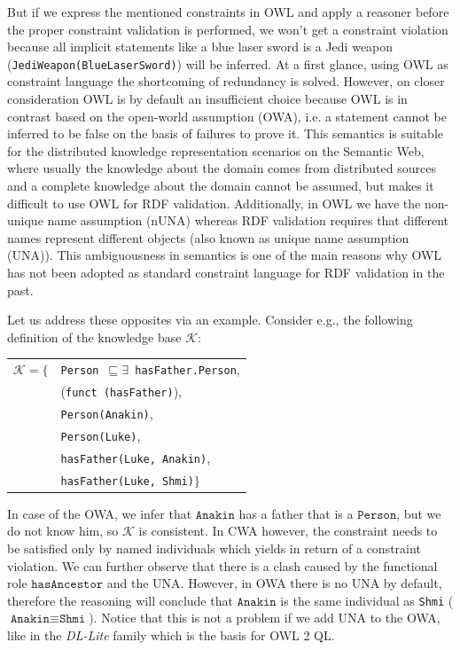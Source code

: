 \documentclass{llncs}
\newcommand{\ms}[1]{\texttt{#1}}
\newenvironment{DL}{
  \begin{tabular}{r l}

}{
  \end{tabular}
  \linebreak
}
\begin{document}
But if we express the mentioned constraints in OWL and apply a reasoner before the proper constraint validation is performed, we won't get a constraint violation because all implicit statements like a blue laser sword is a Jedi weapon (\ms{JediWeapon(BlueLaserSword)}) will be inferred. At a first glance, using OWL as constraint language the shortcoming of redundancy is solved. However, on closer consideration OWL is by default an insufficient choice because OWL is in contrast based on the open-world assumption (OWA), i.e. a statement cannot be inferred to be false on the basis of failures to prove it. 
This semantics is suitable for the distributed knowledge representation scenarios on the Semantic Web, 
where usually the knowledge about the domain comes from distributed
sources and a complete knowledge about the domain cannot be assumed, 
but makes it difficult to use OWL for RDF validation.
Additionally, in OWL we have the non-unique name assumption (nUNA) whereas RDF validation requires that different names represent different objects (also known as unique name assumption (UNA)).
This ambiguousness in semantics is one of the main reasons why OWL has not been adopted as standard constraint language for RDF validation in the past. 

Let us address these opposites via an example. Consider e.g., the following definition of the knowledge base $\mathcal{K}$:
\begin{center}
\begin{DL} 
$\mathcal{K}=\{$ & \ms{Person $\sqsubseteq \exists$ hasFather.Person}, \\
 &(\ms{funct (hasFather)}),\\
 &\ms{Person(Anakin)},\\
  &\ms{Person(Luke)},\\
 &\ms{hasFather(Luke, Anakin)},\\ 
 &\ms{hasFather(Luke, Shmi)}$\}$
\end{DL}
\end{center}
In case of the OWA, we infer that $\ms{Anakin}$ has a father that is a $\ms{Person}$, but we do not know him, so $\mathcal{K}$ is consistent. In CWA however, the constraint needs to be satisfied only by named individuals which yields in return of a constraint violation. We can further observe that there is a clash caused by the functional role $\ms{hasAncestor}$ and the UNA. However, in OWA there is no UNA by default, therefore the reasoning will conclude that $\ms{Anakin}$ is the same individual as \ms{Shmi} ($\ms{Anakin} \equiv \ms{Shmi}$). Notice that this is not a problem if we add UNA to the OWA, like in the \textit{DL-Lite} family \cite{Calvanese2007,Artale2009} which is the basis for OWL 2 QL.
\end{document}
